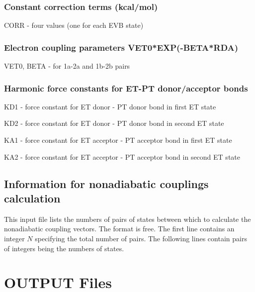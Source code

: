 \documentclass[oneside,11pt,openany]{book}
\newcommand{\tw}{\ttfamily}
\begin{document}
\subsubsection*{Constant correction terms (kcal/mol)}
\begin{description}
\item {\tw CORR} - four values (one for each EVB state)
\end{description}

\subsubsection*{Electron coupling parameters
               {\tw VET0*EXP(-BETA*RDA)}}
\begin{description}
\item {\tw VET0, BETA} - for 1a-2a and 1b-2b pairs
\end{description}

\subsubsection*{Harmonic force constants for ET-PT donor/acceptor bonds}
\begin{description}
\item {\tw KD1} - force constant for ET donor - PT donor bond in first ET state
\item {\tw KD2} - force constant for ET donor - PT donor bond in second ET state
\item {\tw KA1} - force constant for ET acceptor - PT acceptor bond in first ET state
\item {\tw KA2} - force constant for ET acceptor - PT acceptor bond in second ET state
\end{description}


\subsection{Information for nonadiabatic couplings calculation}
%
This input file lists the numbers of pairs of states
between which to calculate the nonadiabatic coupling vectors.
The format is free. The first line contains an integer
$N$ specifying the total number of pairs. The following lines
contain pairs of integers being the numbers of states.


\section{OUTPUT Files}
%
\end{document}
